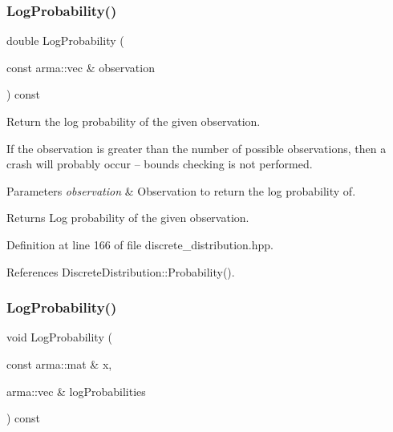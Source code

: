 \mbox{\label{classmlpack_1_1distribution_1_1DiscreteDistribution_a7063c1fb92f512f32bf44542c7528739}} 
\subsubsection{Log\+Probability()\hspace{0.1cm}{\footnotesize\ttfamily [1/2]}}
{\footnotesize\ttfamily double Log\+Probability (\begin{DoxyParamCaption}\item[{const arma\+::vec \&}]{observation }\end{DoxyParamCaption}) const\hspace{0.3cm}{\ttfamily [inline]}}



Return the log probability of the given observation. 

If the observation is greater than the number of possible observations, then a crash will probably occur -- bounds checking is not performed.


\begin{DoxyParams}{Parameters}
{\em observation} & Observation to return the log probability of. \\
\hline
\end{DoxyParams}
\begin{DoxyReturn}{Returns}
Log probability of the given observation. 
\end{DoxyReturn}


Definition at line 166 of file discrete\+\_\+distribution.\+hpp.



References Discrete\+Distribution\+::\+Probability().

\mbox{\label{classmlpack_1_1distribution_1_1DiscreteDistribution_aabd4dbf56bd3d719aede447516d68296}} 
\subsubsection{Log\+Probability()\hspace{0.1cm}{\footnotesize\ttfamily [2/2]}}
{\footnotesize\ttfamily void Log\+Probability (\begin{DoxyParamCaption}\item[{const arma\+::mat \&}]{x,  }\item[{arma\+::vec \&}]{log\+Probabilities }\end{DoxyParamCaption}) const\hspace{0.3cm}{\ttfamily [inline]}}



